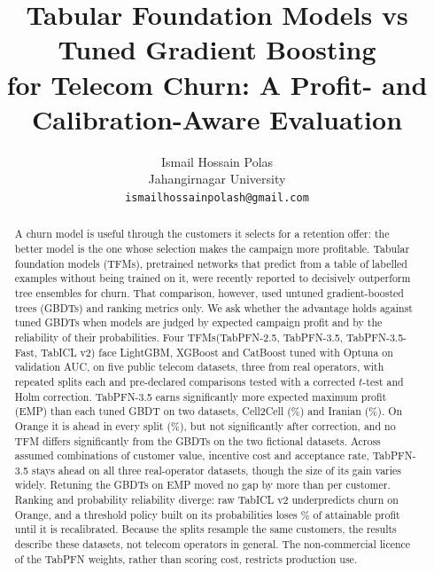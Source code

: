 \documentclass[11pt]{article}
\newcommand{\tfm}{TFM\xspace}
\newcommand{\tfms}{TFMs\xspace}
\begin{document}
\title{Tabular Foundation Models vs Tuned Gradient Boosting\\
for Telecom Churn: A Profit- and Calibration-Aware Evaluation}
\author{Ismail Hossain Polas\\ Jahangirnagar University\\ \texttt{ismailhossainpolash@gmail.com}}
\date{}

\maketitle

\begin{abstract}
A churn model is useful through the customers it selects for a retention offer: the better model is the one whose
selection makes the campaign more profitable. Tabular foundation models (\tfms), pretrained networks that predict from
a table of labelled examples without being trained on it, were recently reported to decisively outperform tree
ensembles for churn. That comparison, however, used untuned gradient-boosted trees (GBDTs) and ranking metrics only. We
ask whether the advantage holds against tuned GBDTs when models are judged by expected campaign profit and by the
reliability of their probabilities. Four \tfms (TabPFN-2.5, TabPFN-3.5, TabPFN-3.5-Fast, TabICL v2) face LightGBM, XGBoost and
CatBoost tuned with Optuna on validation AUC, on five public telecom datasets, three from real operators, with \nSeeds{} repeated
splits each and \nPrimary{} pre-declared comparisons tested with a corrected $t$-test and Holm correction. TabPFN-3.5
earns significantly more expected maximum profit (EMP) than each tuned GBDT on two datasets, Cell2Cell
(\empPFNThreeCellTwoCellAbs\%) and Iranian (\empPFNThreeIranianAbs\%). On Orange it is ahead in every split
(\empPFNThreeOrangeAbs\%), but not significantly after correction, and no \tfm differs significantly from the GBDTs on the
two fictional datasets.
Across \nScenarios{} assumed combinations of customer value, incentive cost and acceptance rate, TabPFN-3.5 stays ahead on
all three real-operator datasets, though the size of its gain varies widely. Retuning the GBDTs on EMP moved no gap by
more than \maxEmpTuneShift{} per customer.
Ranking and probability reliability diverge: raw TabICL v2 underpredicts churn on Orange, and a threshold policy built on
its probabilities loses \regICLOrangeRaw\% of attainable profit until it is recalibrated. Because the splits resample the
same customers, the results describe these datasets, not telecom operators in general. The non-commercial licence of
the TabPFN weights, rather than scoring cost, restricts production use.
\end{abstract}
\end{document}
